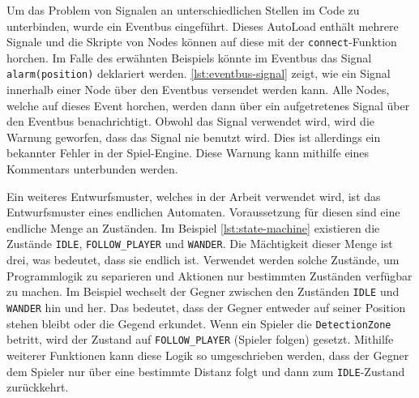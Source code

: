 Um das Problem von Signalen an unterschiedlichen Stellen im Code zu unterbinden, wurde ein Eventbus eingeführt\cite{dzone-eventbus}. Dieses AutoLoad enthält mehrere Signale und die Skripte von Nodes können auf diese mit der \texttt{connect}-Funktion horchen. Im Falle des erwähnten Beispiels könnte im Eventbus das Signal \texttt{alarm(position)} deklariert werden. \autoref{lst:eventbus-signal} zeigt, wie ein Signal innerhalb einer Node über den Eventbus versendet werden kann. Alle Nodes, welche auf dieses Event horchen, werden dann über ein aufgetretenes Signal über den Eventbus benachrichtigt. Obwohl das Signal verwendet wird, wird die Warnung geworfen, dass das Signal nie benutzt wird. Dies ist allerdings ein bekannter Fehler in der Spiel-Engine\cite{godot-signal-warning}. Diese Warnung kann mithilfe eines Kommentars unterbunden werden. \\


Ein weiteres Entwurfsmuster, welches in der Arbeit verwendet wird, ist das Entwurfsmuster eines endlichen Automaten\cite{gamepattern-state}. Voraussetzung für diesen sind eine endliche Menge an Zuständen. Im Beispiel \autoref{lst:state-machine} existieren die Zustände \texttt{IDLE}, \texttt{FOLLOW\_PLAYER} und \texttt{WANDER}. Die Mächtigkeit dieser Menge ist drei, was bedeutet, dass sie endlich ist. Verwendet werden solche Zustände, um Programmlogik zu separieren und Aktionen nur bestimmten Zuständen verfügbar zu machen. Im Beispiel wechselt der Gegner zwischen den Zuständen \texttt{IDLE} und \texttt{WANDER} hin und her. Das bedeutet, dass der Gegner entweder auf seiner Position stehen bleibt oder die Gegend erkundet. Wenn ein Spieler die \texttt{DetectionZone} betritt, wird der Zustand auf \texttt{FOLLOW\_PLAYER} (Spieler folgen) gesetzt. Mithilfe weiterer Funktionen kann diese Logik so umgeschrieben werden, dass der Gegner dem Spieler nur über eine bestimmte Distanz folgt und dann zum \texttt{IDLE}-Zustand zurückkehrt.\\
